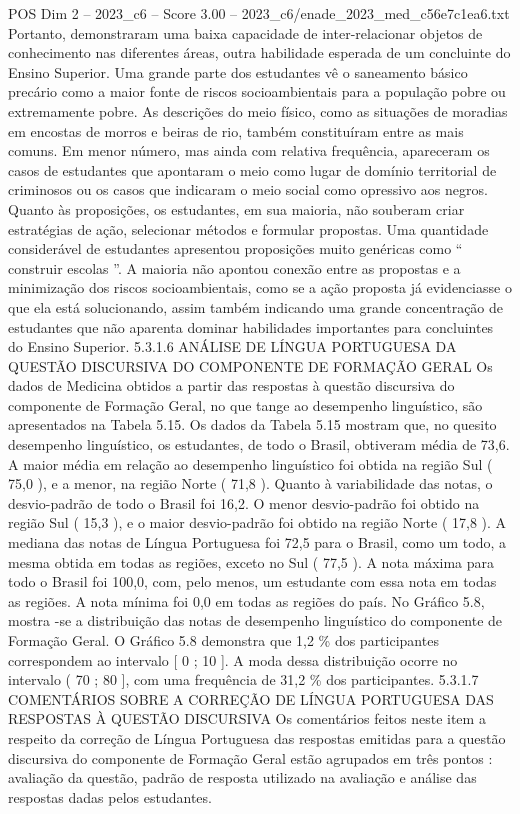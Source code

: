 \begin{textsample}{POS Dim 2 – 2023\_c6 – Score 3.00 – 2023\_c6/enade\_2023\_med\_c56e7c1ea6.txt}
Portanto, demonstraram uma baixa capacidade de inter-relacionar objetos de conhecimento nas diferentes áreas, outra habilidade esperada de um concluinte do Ensino Superior.
Uma grande parte dos estudantes vê o saneamento básico precário como a maior fonte de riscos socioambientais para a população pobre ou extremamente pobre.
As descrições do meio físico, como as situações de moradias em encostas de morros e beiras de rio, também constituíram entre as mais comuns.
Em menor número, mas ainda com relativa frequência, apareceram os casos de estudantes que apontaram o meio como lugar de domínio territorial de criminosos ou os casos que indicaram o meio social como opressivo aos negros.
Quanto às proposições, os estudantes, em sua maioria, não souberam criar estratégias de ação, selecionar métodos e formular propostas.
Uma quantidade considerável de estudantes apresentou proposições muito genéricas como “ construir escolas ”.
A maioria não apontou conexão entre as propostas e a minimização dos riscos socioambientais, como se a ação proposta já evidenciasse o que ela está solucionando, assim também indicando uma grande concentração de estudantes que não aparenta dominar habilidades importantes para concluintes do Ensino Superior. 5.3.1.6 ANÁLISE DE LÍNGUA PORTUGUESA DA QUESTÃO DISCURSIVA DO COMPONENTE DE FORMAÇÃO GERAL Os dados de Medicina obtidos a partir das respostas à questão discursiva do componente de Formação Geral, no que tange ao desempenho linguístico, são apresentados na Tabela 5.15.
Os dados da Tabela 5.15 mostram que, no quesito desempenho linguístico, os estudantes, de todo o Brasil, obtiveram média de 73,6.
A maior média em relação ao desempenho linguístico foi obtida na região Sul ( 75,0 ), e a menor, na região Norte ( 71,8 ).
Quanto à variabilidade das notas, o desvio-padrão de todo o Brasil foi 16,2.
O menor desvio-padrão foi obtido na região Sul ( 15,3 ), e o maior desvio-padrão foi obtido na região Norte ( 17,8 ).
A mediana das notas de Língua Portuguesa foi 72,5 para o Brasil, como um todo, a mesma obtida em todas as regiões, exceto no Sul ( 77,5 ).
A nota máxima para todo o Brasil foi 100,0, com, pelo menos, um estudante com essa nota em todas as regiões.
A nota mínima foi 0,0 em todas as regiões do país.
No Gráfico 5.8, mostra -se a distribuição das notas de desempenho linguístico do componente de Formação Geral.
O Gráfico 5.8 demonstra que 1,2 \% dos participantes correspondem ao intervalo [ 0 ; 10 ].
A moda dessa distribuição ocorre no intervalo ( 70 ; 80 ], com uma frequência de 31,2 \% dos participantes. 5.3.1.7 COMENTÁRIOS SOBRE A CORREÇÃO DE LÍNGUA PORTUGUESA DAS RESPOSTAS À QUESTÃO DISCURSIVA Os comentários feitos neste item a respeito da correção de Língua Portuguesa das respostas emitidas para a questão discursiva do componente de Formação Geral estão agrupados em três pontos : avaliação da questão, padrão de resposta utilizado na avaliação e análise das respostas dadas pelos estudantes.

\end{textsample}
